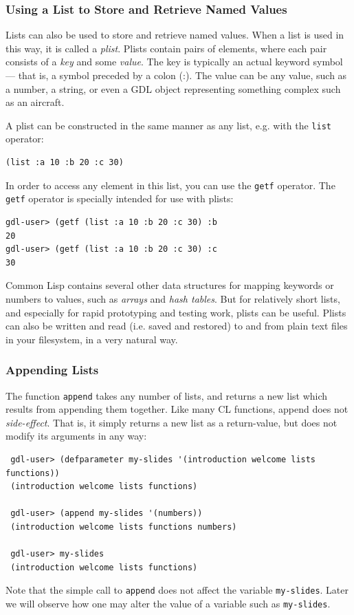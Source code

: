 \documentclass [11pt]{book}
\begin{document}
\subsubsection{Using a List to Store and Retrieve Named Values}

\label{subsubsec:usingalisttostoreandretrievenamedvalues}

Lists can also be used to store and retrieve named values. When a list is used in this way, 
it is called a \emph{plist}. Plists contain pairs of elements, where each pair consists of a \emph{key} and some \emph{value}. The key is typically an actual keyword symbol --- that is,
a symbol preceded by a colon (:). The value can be any value, such as
a number, a string, or even a GDL object representing something
complex such as an aircraft.

A plist can be constructed in the same manner as any list, e.g. with the \texttt{list} operator:

\begin{verbatim}(list :a 10 :b 20 :c 30)
\end{verbatim}In order to access any element in this list, you can use the \texttt{getf} operator. The \texttt{getf} operator is specially intended for use with plists:

\begin{verbatim}gdl-user> (getf (list :a 10 :b 20 :c 30) :b
20
gdl-user> (getf (list :a 10 :b 20 :c 30) :c
30
\end{verbatim} Common Lisp contains several other data structures for mapping keywords or numbers to values, such
as \emph{arrays} and \emph{hash tables}. But for relatively short lists, and especially for rapid prototyping and testing work, plists
can be useful. Plists can also be written and read (i.e. saved and restored) to and from plain text files
in your filesystem, in a very natural way.

\subsubsection{Appending Lists}

\label{subsubsec:appendinglists}

The function \texttt{append} takes any number of lists, and returns a new list which results from
appending them together. Like many CL functions, append does not \emph{side-effect}. That is, it simply returns a new list as a return-value, but does not modify its 
arguments in any way:

\begin{verbatim}
 gdl-user> (defparameter my-slides '(introduction welcome lists functions))
 (introduction welcome lists functions)

 gdl-user> (append my-slides '(numbers))
 (introduction welcome lists functions numbers)

 gdl-user> my-slides
 (introduction welcome lists functions)
\end{verbatim}Note that the simple call to \texttt{append} does not affect the variable \texttt{my-slides}. Later we will observe how one may alter the value of a
variable such as \texttt{my-slides}.
\end{document}
